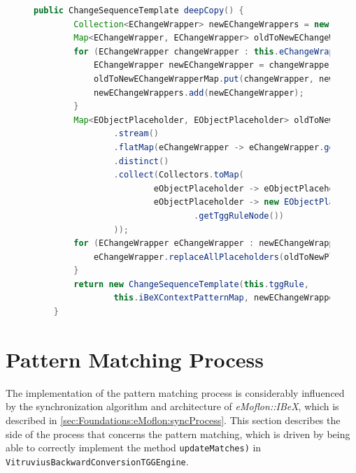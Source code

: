 \begin{figure}[H]
\centering
\begin{lstlisting}[language=java, caption={Copy mechanism in \texttt{ChangeSequenceTemplate}}, captionpos=b, label=implCSTdeepCopy]
public ChangeSequenceTemplate deepCopy() {
        Collection<EChangeWrapper> newEChangeWrappers = new LinkedList<>();
        Map<EChangeWrapper, EChangeWrapper> oldToNewEChangeWrapperMap = new HashMap<>();
        for (EChangeWrapper changeWrapper : this.eChangeWrappers) {
            EChangeWrapper newEChangeWrapper = changeWrapper.shallowCopy();
            oldToNewEChangeWrapperMap.put(changeWrapper, newEChangeWrapper);
            newEChangeWrappers.add(newEChangeWrapper);
        }
        Map<EObjectPlaceholder, EObjectPlaceholder> oldToNewPlaceholders = newEChangeWrappers
                .stream()
                .flatMap(eChangeWrapper -> eChangeWrapper.getAllPlaceholders().stream())
                .distinct()
                .collect(Collectors.toMap(
                        eObjectPlaceholder -> eObjectPlaceholder,
                        eObjectPlaceholder -> new EObjectPlaceholder(eObjectPlaceholder
                                .getTggRuleNode())
                ));
        for (EChangeWrapper eChangeWrapper : newEChangeWrappers) {
            eChangeWrapper.replaceAllPlaceholders(oldToNewPlaceholders);
        }
        return new ChangeSequenceTemplate(this.tggRule, 
                this.iBeXContextPatternMap, newEChangeWrappers, oldToNewEChangeWrapperMap);;
    }
\end{lstlisting}
\end{figure}

\section{Pattern Matching Process}
\label{sec:Implementation:PatternMatchingProcess}
The implementation of the pattern matching process is considerably influenced by the synchronization algorithm and architecture of \emph{eMoflon::IBeX}, which is described in \autoref{sec:Foundations:eMoflon:syncProcess}.
This section describes the side of the process that concerns the pattern matching, which is driven by being able to correctly implement the method \texttt{updateMatches)} in \texttt{VitruviusBackwardConversionTGGEngine}.

